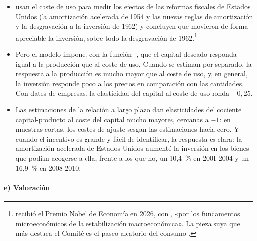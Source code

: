 \documentclass[11pt]{article}
\begin{document}
\begin{itemize}
\item \textcite{HallJorgenson1967Tax} usan el coste de uso para medir los efectos de las reformas fiscales de Estados Unidos (la amortización acelerada de 1954 y las nuevas reglas de amortización y la desgravación a la inversión de 1962) y concluyen que movieron de forma apreciable la inversión, sobre todo la desgravación de 1962.\footnote{ recibió el Premio Nobel de Economía en 2026, con , «por los fundamentos microeconómicos de la estabilización macroeconómica»\nocite{Nobel2026Prensa}. La pieza suya que más destaca el Comité es el paseo aleatorio del consumo .}
\item Pero el modelo impone, con la función -, que el capital deseado responda igual a la producción que al coste de uso. Cuando se estiman por separado, la respuesta a la producción es mucho mayor que al coste de uso\nocite{EisnerNadiri1968Investment}, y, en general, la inversión responde poco a los precios en comparación con las cantidades\nocite{Chirinko1993Business}. Con datos de empresas, la elasticidad del capital al coste de uso ronda $-0{,}25$\nocite{ChirinkoFazzariMeyer1999}.
\item Las estimaciones de la relación a largo plazo dan elasticidades del cociente capital-producto al coste del capital mucho mayores, cercanas a $-1$: en muestras cortas, los costes de ajuste sesgan las estimaciones hacia cero\nocite{Caballero1994Small}. Y cuando el incentivo es grande y fácil de identificar, la respuesta es clara: la amortización acelerada de Estados Unidos aumentó la inversión en los bienes que podían acogerse a ella, frente a los que no, un 10,4~\% en 2001-2004 y un 16,9~\% en 2008-2010\nocite{ZwickMahon2017Tax}.
\end{itemize}

\paragraph{e) Valoración}
\end{document}
